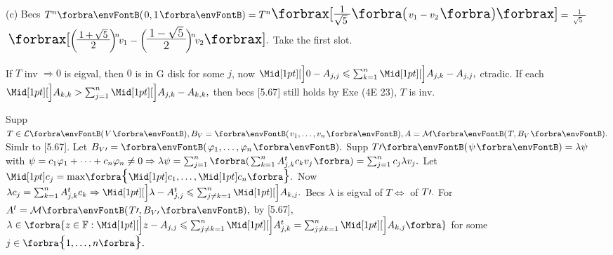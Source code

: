 (c) Becs $T^n\Par{0,1}=T^n\XSbra{${\Large$\frac{1}{\sqrt{5}\;}$}$\BigPar{v_1-v_2}}={}${\Large$\frac{1}{\sqrt{5}\;}$}$\,\def\envFont{\Large}\XSbra{\bigg(\!${\Large$\frac{\:1\,+\,\sqrt{5}\:}{2}$}$\!\bigg)\begin{array}{l}\hspace{-7pt}{}_n\\\\\vspace{-8pt}\end{array}\hspace{-8pt}v_1-\bigg(\!${\LARGE$\frac{\:1\,-\,\sqrt{5}\:}{2}$}$\!\bigg)\begin{array}{l}\hspace{-7pt}{}_n\\\\\vspace{-8pt}\end{array}\hspace{-8pt}v_2\def\envFont{\Large}}.$ Take the first slot.\PfEnd[-28pt]\vspace{4pt}
\SepLine

If $T$ inv $\Rightarrow 0$ is eigval, then $0$ is in G disk for some $j$, now $\aXMid{0-A_{j,j}}\leqslant\sum_{k=1}^n\aXMid{A_{j,k}}-A_{j,j},$ ctradic.\PfEnd
\AComm If each $\aXMid{A_{k,k}}>\sum_{j=1}^n\aXMid{A_{j,k}}-A_{k,k},$ then becs [5.67] still holds by Exe (4E 23), $T$ is inv.
\SepLine

Supp $T\in\Lm{V},B_V=\Par{v_1,\dots,v_n},A=\Mt{T,B_V}.$ Simlr to [5.67]. Let $B_{V\apostrophe}=\Par{\varphi_1,\dots,\varphi_n}.$\vspace{1pt}\parSol{}
Supp $T\apostrophe\Par{\psi}=\lambda\psi$ with $\psi=c_1\varphi_1+\dots+c_n\varphi_n\neq0\Rightarrow\lambda\psi=\sum_{j=1}^n\BigBigPar{{\sum_{k=1}^nA^t_{j,k}c_kv_j}}=\sum_{j=1}^nc_j\lambda v_j.$\vspace{2pt}\parSol{}
Let $\aMid{c_j}=\max\!\Bra{\aMid{c_1},\dots,\aMid{c_n}}.$ Now $\lambda c_j=\sum_{k=1}^nA^t_{j,k}c_k\Rightarrow\aXMid{\lambda-A^t_{j,j}}\leqslant\sum_{j\neq k=1}^n\aXMid{A_{k,j}}.$\PfEnd\vspace{6pt}\parSol{}
\Or Becs $\lambda$ is eigval of $T\Longleftrightarrow$ of $T\prime.$ For $A^t=\Mt{T\apostrophe,B_{V\apostrophe}},$ by [5.67],\vspace{1pt}\parSol{}
$\lambda\in\BigBra{z\in\Fbb:\aXMid{z-A_{j,j}}\leqslant\sum_{j\neq k=1}^n\aXMid{A^t_{j,k}}=\sum_{j\neq k=1}^n\aXMid{A_{k,j}}}$ for some $j\in\Bra{1,\dots,n}.$\PfEnd
\SepLine

